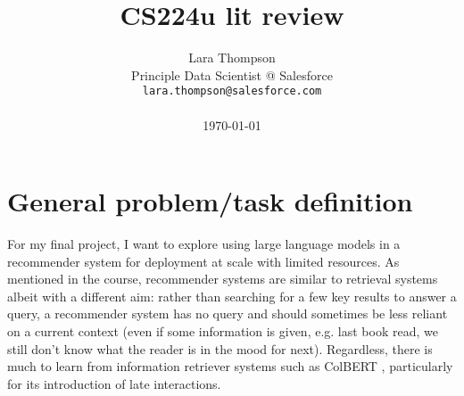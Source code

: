 \documentclass[11pt]{article}
\title{CS224u lit review}
\author{Lara Thompson \\
  Principle Data Scientist @ Salesforce \\
  \texttt{lara.thompson@salesforce.com} \\ \\
  \today
}
\begin{document}
\maketitle







\section{General problem/task definition}

For my final project, I want to explore using large language models in a recommender system for deployment at scale with limited resources. As mentioned in the course, recommender systems are similar to retrieval systems albeit with a different aim: rather than searching for a few key results to answer a query, a recommender system has no query and should sometimes be less reliant on a current context (even if some information is given, e.g. last book read, we still don't know what the reader is in the mood for next). Regardless, there is much to learn from information retriever systems such as ColBERT \cite{ColBERT}, particularly for its introduction of late interactions. 
\end{document}
